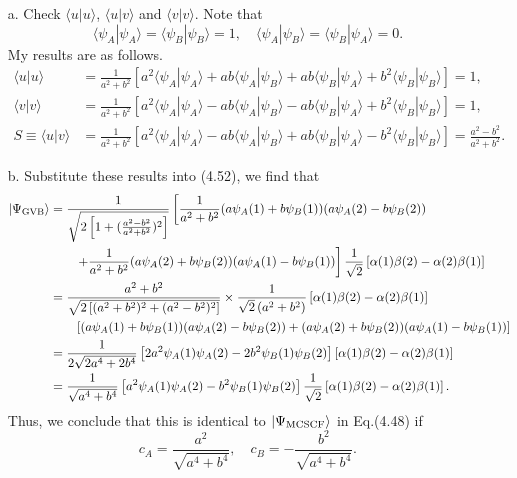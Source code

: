 \documentclass[a4paper]{book}
\begin{document}
	\begin{solution}
	
	\begin{enumerate}
	
	\item[a.] Check $\langle u | u \rangle$, $\langle u | v \rangle$ and $\langle v | v \rangle$.  Note that
	\[
		\langle \psi_A | \psi_A \rangle = \langle \psi_B | \psi_B \rangle = 1, \quad \langle \psi_A | \psi_B \rangle = \langle \psi_B | \psi_A \rangle = 0.
	\]
	My results are as follows.
	\begin{align}
		\langle u | u \rangle &= \frac{1}{ a^2+b^2 } \left[ a^2 \langle \psi_A | \psi_A \rangle + ab \langle \psi_A | \psi_B \rangle + ab \langle \psi_B | \psi_A \rangle + b^2 \langle \psi_B | \psi_B \rangle \right] = 1 , \\
		\langle v | v \rangle &= \frac{1}{ a^2+b^2 } \left[ a^2 \langle \psi_A | \psi_A \rangle - ab \langle \psi_A | \psi_B \rangle - ab \langle \psi_B | \psi_A \rangle + b^2 \langle \psi_B | \psi_B \rangle \right] = 1 , \\
		S \equiv \langle u | v \rangle &= \frac{1}{ a^2+b^2 } \left[ a^2 \langle \psi_A | \psi_A \rangle - ab \langle \psi_A | \psi_B \rangle + ab \langle \psi_B | \psi_A \rangle - b^2 \langle \psi_B | \psi_B \rangle \right] = \frac{ a^2 - b^2 }{ a^2 + b^2 }.
	\end{align}
		
	\item[b.] Substitute these results into (4.52), we find that	
	\begin{align}
		| \Psi_{\rm GVB} \rangle &= \frac{1}{ \sqrt{ 2 \left[ 1 + ( \frac{ a^2 - b^2 }{ a^2 + b^2 } )^2 \right] } } \left[ \frac{1}{ a^2 + b^2 } ( a \psi_A(1) + b \psi_B(1) )( a \psi_A(2) - b \psi_B(2) ) \right. \notag \\
		&\hspace{2em} \left. + \frac{1}{ a^2 + b^2 } ( a \psi_A(2) + b \psi_B(2) )( a \psi_A(1) - b \psi_B(1) ) \right] \frac{1}{ \sqrt{2} } \left[ \alpha(1) \beta(2) - \alpha(2) \beta(1) \right] \notag \\
		&=\frac{ a^2 + b^2 }{ \sqrt{ 2 \left[ ( a^2 + b^2 )^2 + ( a^2 - b^2 )^2 \right] } } \times \frac{1}{ \sqrt{2} \left( a^2 + b^2 \right) } \left[ \alpha(1) \beta(2) - \alpha(2) \beta(1) \right] \notag \\
		&\hspace{2em}\left[ ( a \psi_A(1) + b \psi_B(1) )( a \psi_A(2) - b \psi_B(2) ) + ( a \psi_A(2) + b \psi_B(2) )( a \psi_A(1) - b \psi_B(1) ) \right] \notag \\ 
		&= \frac{ 1 }{ 2 \sqrt{ 2a^4 + 2b^4 } } \left[ 2 a^2 \psi_A(1) \psi_A(2) - 2 b^2 \psi_B(1) \psi_B(2) \right] \left[ \alpha(1) \beta(2) - \alpha(2) \beta(1) \right] \notag \\
		&= \frac{ 1 }{ \sqrt{ a^4 + b^4 } }  \left[ a^2 \psi_A(1) \psi_A(2) - b^2 \psi_B(1) \psi_B(2) \right] \frac{1}{ \sqrt{2} } \left[ \alpha(1) \beta(2) - \alpha(2) \beta(1) \right].
	\end{align}
	Thus, we conclude that this is identical to $|\Psi_{\rm MCSCF}\rangle$ in Eq.(4.48) if
	\[
		c_A = \frac{ a^2 }{ \sqrt{ a^4 + b^4 } } , \quad c_B = -\frac{ b^2 }{ \sqrt{ a^4 + b^4 } }.
	\]
	\end{enumerate}		
		

\end{solution}
\end{document}
